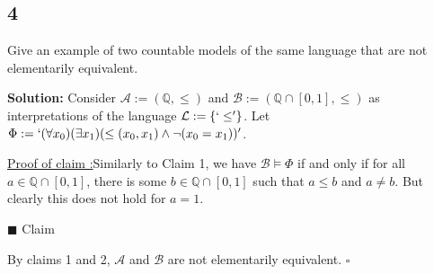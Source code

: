 \documentclass[12pt]{article}
\newcounter{ProofCounter}
\newcounter{ClaimCounter}[ProofCounter]
\newenvironment{Solution}{\stepcounter{ProofCounter}\textbf{Solution:}}{\hfill$\square$}
\newenvironment{claim}[1]{\vspace{1mm}\stepcounter{ClaimCounter}\par\noindent\underline{\bf Claim \theClaimCounter:}\space#1}{}
\newenvironment{claimproof}[1]{\par\noindent\underline{Proof of claim \theClaimCounter:}\space#1}{\hfill $\blacksquare$ Claim \theClaimCounter}
\begin{document}
\newpage
\subsection*{4}
\begin{tcolorbox}
  Give an example of two countable models of the same language that are not elementarily equivalent.
\end{tcolorbox}
\begin{Solution}
  Consider $\mathcal{A} := (\mathbb{Q}, \leq)$ and $\mathcal{B} := (\mathbb{Q} \cap [0,1], \leq)$ as interpretations of the language $\mathcal{L} :=
  \{`\leq'\}$. Let $\Phi := `(\forall x_0)(\exists x_1)(\leq (x_0, x_1) \wedge \neg (x_0 = x_1))'$.


  \begin{claimproof}
    Similarly to Claim 1, we have $\mathcal{B} \models \Phi$ 
    if and only if for all $a \in \mathbb{Q} \cap [0,1]$, there is some $b \in \mathbb{Q} \cap [0,1]$ such that $a \leq b$ and $a \neq b$.
    But clearly this does not hold for $a = 1$.

  \end{claimproof}

  By claims 1 and 2, $\mathcal{A}$ and $\mathcal{B}$ are not elementarily equivalent.
\end{Solution}

\newpage
\end{document}
